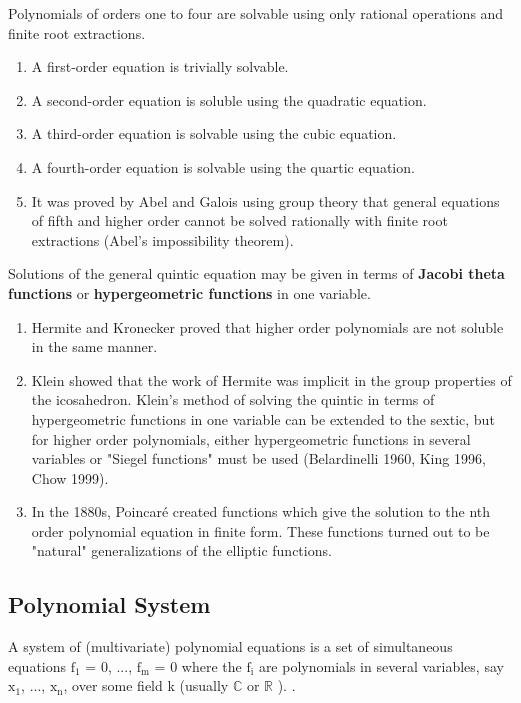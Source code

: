 \documentclass[11pt]{article}
\begin{document}
 Polynomials of orders one to four are solvable using only rational operations and finite root extractions. \cite{wolframPolynomial}
\begin{enumerate}
\item A first-order equation is trivially solvable.
\item A second-order equation is soluble using the quadratic equation.
\item A third-order equation is solvable using the cubic equation.
\item A fourth-order equation is solvable using the quartic equation.
\item It was proved by Abel and Galois using group theory that general equations of fifth and higher order cannot be solved rationally with finite root extractions (Abel's impossibility theorem).
\end{enumerate}

Solutions of the general quintic equation may be given in terms of \textbf{Jacobi theta functions} or \textbf{hypergeometric functions} in one variable.\cite{wolframPolynomial}
\begin{enumerate}
\item Hermite and Kronecker proved that higher order polynomials are not soluble in the same manner.
\item Klein showed that the work of Hermite was implicit in the group properties of the icosahedron. Klein's method of solving the quintic in terms of hypergeometric functions in one variable can be extended to the sextic, but for higher order polynomials, either hypergeometric functions in several variables or "Siegel functions" must be used (Belardinelli 1960, King 1996, Chow 1999).
\item In the 1880s, Poincaré created functions which give the solution to the nth order polynomial equation in finite form. These functions turned out to be "natural" generalizations of the elliptic functions.
\end{enumerate}




\subsection{Polynomial System}

A system of (multivariate) polynomial equations is a set of simultaneous equations $\mathrm{f_{1}}$  = 0, ..., $\mathrm{f_{m}}$ = 0 where the $\mathrm{f_{i}}$ are polynomials in several variables, say $\mathrm{x_{1}}$, ..., $\mathrm{x_{n}}$, over some field k (usually $\mathbb{C}$ or $\mathbb{R}$ ).
\cite{wikipediaSystemofPolynomialEquations}.
\end{document}
